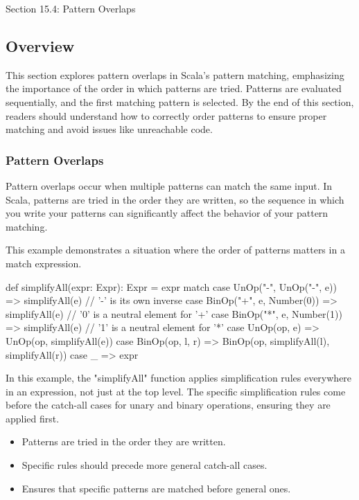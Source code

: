 \begin{notes}{Section 15.4: Pattern Overlaps}
    \subsection*{Overview}

    This section explores pattern overlaps in Scala's pattern matching, emphasizing the importance of the order in which patterns are tried. Patterns are evaluated sequentially, and the first matching 
    pattern is selected. By the end of this section, readers should understand how to correctly order patterns to ensure proper matching and avoid issues like unreachable code.
    
    \subsubsection*{Pattern Overlaps}
    
    Pattern overlaps occur when multiple patterns can match the same input. In Scala, patterns are tried in the order they are written, so the sequence in which you write your patterns can significantly 
    affect the behavior of your pattern matching.
    
    \begin{highlight}
    
        This example demonstrates a situation where the order of patterns matters in a match expression.
    
    \begin{code}[Scala]
    def simplifyAll(expr: Expr): Expr = expr match {
    case UnOp("-", UnOp("-", e)) =>
        simplifyAll(e) // '-' is its own inverse
    case BinOp("+", e, Number(0)) =>
        simplifyAll(e) // '0' is a neutral element for '+'
    case BinOp("*", e, Number(1)) =>
        simplifyAll(e) // '1' is a neutral element for '*'
    case UnOp(op, e) =>
        UnOp(op, simplifyAll(e))
    case BinOp(op, l, r) =>
        BinOp(op, simplifyAll(l), simplifyAll(r))
    case _ => expr
    }
    \end{code}
    
        In this example, the "simplifyAll" function applies simplification rules everywhere in an expression, not just at the top level. The specific simplification rules come before the catch-all 
        cases for unary and binary operations, ensuring they are applied first.
    
        \begin{itemize}
            \item Patterns are tried in the order they are written.
            \item Specific rules should precede more general catch-all cases.
            \item Ensures that specific patterns are matched before general ones.
        \end{itemize}
    

\end{highlight}
\end{notes}
